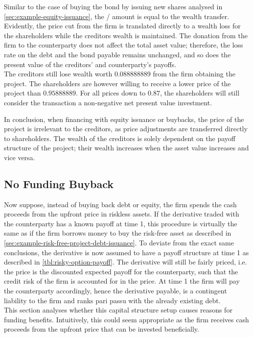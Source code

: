 \documentclass[main.tex]{subfiles}
\begin{document}
            Similar to the case of buying the bond by issuing new shares analysed in \cref{sec:example-equity-issuance},
            the \FVA/ amount is equal to the wealth transfer.
            Evidently, the price cut from the firm is translated directly to a wealth loss
            for the shareholders while the creditors wealth is maintained. 
            The donation from the firm to the counterparty does not affect the total asset value;
            therefore, the loss rate on the debt and the bond payable remains unchanged,
            and so does the present value of the creditors' and counterparty's payoffs.
            \\
            The creditors still lose wealth worth \num{0.088888889} from the firm obtaining the project.
            The shareholders are however willing to receive a lower price of the project than $\num{0.95888889}$.
            For all prices down to $\num{0.87}$,
            the shareholders will still consider the transaction a non-negative net present value investment.

            In conclusion, when financing with equity issuance or buybacks,
            the price of the project is irrelevant to the creditors,
            as price adjustments are transferred directly to shareholders.
            The wealth of the creditors is solely dependent on the payoff structure of the project;
            their wealth increases when the asset value increases and vice versa.

        \subsection{No Funding Buyback}
            Now suppose, instead of buying back debt or equity, 
            the firm spends the cash proceeds from the upfront price in riskless assets. 
            If the derivative traded with the counterparty has a known payoff at time 1, this procedure is virtually the same as if the firm borrows money to buy the risk-free asset 
            as described in \cref{sec:example-risk-free-project-debt-issuance}. 
            To deviate from the exact same conclusions, the derivative is now assumed to have a payoff structure at time 1 
            as described in \cref{tbl:risky-option-payoff}. 
            The derivative will still be fairly priced, i.e. the price is the discounted expected payoff for the counterparty, 
            such that the credit risk of the firm is accounted for in the price. 
            At time 1 the firm will pay the counterparty accordingly, hence the derivative payable, 
            is a contingent liability to the firm and ranks pari passu with the already existing debt.
            \\
            This section analyses whether this capital structure setup causes reasons for funding benefits.
            Intuitively, this could seem appropriate as the firm receives cash proceeds from the upfront price that can be invested beneficially.
            
\end{document}
